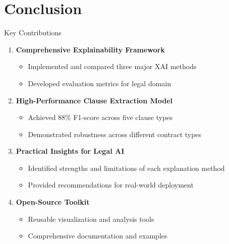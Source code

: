 
\section{Conclusion}

\begin{frame}{Key Contributions}
\begin{enumerate}
    \item \textbf{Comprehensive Explainability Framework}
    \begin{itemize}
        \item Implemented and compared three major XAI methods
        \item Developed evaluation metrics for legal domain
    \end{itemize}
    
    \item \textbf{High-Performance Clause Extraction Model}
    \begin{itemize}
        \item Achieved 88\% F1-score across five clause types
        \item Demonstrated robustness across different contract types
    \end{itemize}
    
    \item \textbf{Practical Insights for Legal AI}
    \begin{itemize}
        \item Identified strengths and limitations of each explanation method
        \item Provided recommendations for real-world deployment
    \end{itemize}
    
    \item \textbf{Open-Source Toolkit}
    \begin{itemize}
        \item Reusable visualization and analysis tools
        \item Comprehensive documentation and examples
    \end{itemize}
\end{enumerate}
\end{frame}

